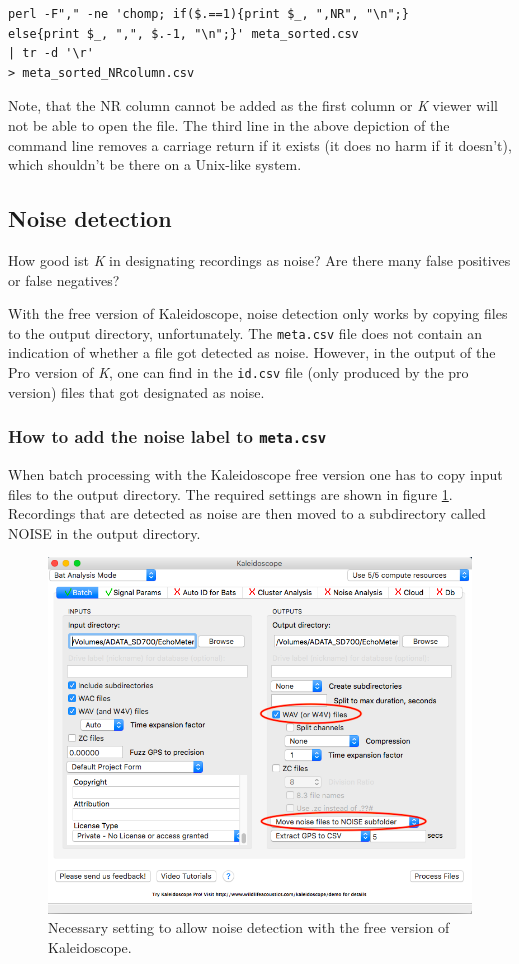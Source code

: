 \documentclass[English, 11pt, twoside, authoryear]{article}
\begin{document}
\begin{lstlisting}
perl -F"," -ne 'chomp; if($.==1){print $_, ",NR", "\n";}
else{print $_, ",", $.-1, "\n";}' meta_sorted.csv 
| tr -d '\r' 
> meta_sorted_NRcolumn.csv
\end{lstlisting}

Note, that the NR column cannot be added as the first column or \emph{K} viewer will not be able to open the file. The third line in the above depiction of the command line removes a carriage return if it exists (it does no harm if it doesn't), which shouldn't be there on a Unix-like system.

%
%
%
\subsection{Noise detection}
%
%
%
How good ist \emph{K} in designating recordings as noise? Are there many false positives or false negatives?

With the free version of Kaleidoscope, noise detection only works by copying files to the output directory, unfortunately. The \texttt{meta.csv} file does not contain an indication of whether a file got detected as noise. However, in the output of the Pro version of \emph{K}, one can find in the \texttt{id.csv} file (only produced by the pro version) files that got designated as noise.

%
%
%
\subsubsection{How to add the noise label to \texttt{meta.csv}}
%
%
%
When batch processing with the Kaleidoscope free version one has to copy input files to the output directory. The required settings are shown in figure \ref{Batch_proc_for_noise_detection}. Recordings that are detected as noise are then moved to a subdirectory called NOISE in the output directory.

\begin{figure}[htbp]
\begin{center}
\includegraphics[width=.7\textwidth]{Fig/Batch_proc_for_noise_detection}
\caption{Necessary setting to allow noise detection with the free version of Kaleidoscope.}
\label{Batch_proc_for_noise_detection}
\end{center}
\end{figure}
\end{document}
